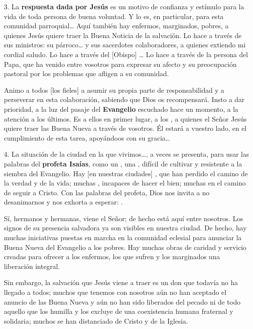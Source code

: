 3. La \textbf{respuesta dada por Jesús} es un motivo de confianza y estímulo para la vida de toda persona de buena voluntad. Y lo es, en particular, para esta comunidad parroquial\ldots{} Aquí también hay enfermos, marginados, pobres, a quienes Jesús quiere traer la Buena Noticia de la salvación. Lo hace a través de sus ministros: su párroco\ldots{} y sus sacerdotes colaboradores, a quienes extiendo mi cordial saludo. Lo hace a través del {[}Obispo{]} \ldots{} Lo hace a través de la persona del Papa, que ha venido entre vosotros para expresar su afecto y su preocupación pastoral por los problemas que afligen a su comunidad.

Animo a todos {[}los fieles{]} a asumir su propia parte de responsabilidad y a perseverar en esta colaboración, sabiendo que Dios os recompensará. Insto a dar prioridad, a la luz del pasaje del \textbf{Evangelio} escuchado hace un momento, a la atención a los últimos. Es a ellos en primer lugar, a los , a quienes el Señor Jesús quiere traer las Buena Nueva a través de vosotros. Él estará a vuestro lado, en el cumplimiento de esta tarea, apoyándoos con su gracia\ldots{}

4. La situación de la ciudad en la que vivimos\ldots{}, a veces se presenta, para usar las palabras del \textbf{profeta Isaías}, como un , una , difícil de cultivar y resistente a la siembra del Evangelio. Hay {[}en nuestras ciudades{]} , que han perdido el camino de la verdad y de la vida; muchas , incapaces de hacer el bien; muchas  en el camino de seguir a Cristo. Con las palabras del profeta, Dios nos invita a no desanimarnos y nos exhorta a esperar: .

Sí, hermanos y hermanas, viene el Señor; de hecho está aquí entre nosotros. Los signos de su presencia salvadora ya son visibles en nuestra ciudad. De hecho, hay muchas iniciativas puestas en marcha en la comunidad eclesial para anunciar la Buena Nueva del Evangelio a los pobres. Hay muchas obras de caridad y servicio creadas para ofrecer a los enfermos, los que sufren y los marginados una liberación integral.

Sin embargo, la salvación que Jesús viene a traer es un don que todavía no ha llegado a todos; muchos  que tenemos con nosotros aún no han aceptado el anuncio de las Buena Nueva y aún no han sido liberados del pecado ni de todo aquello que los humilla y los excluye de una coexistencia humana fraternal y solidaria; muchos  se han distanciado de Cristo y de la Iglesia.

